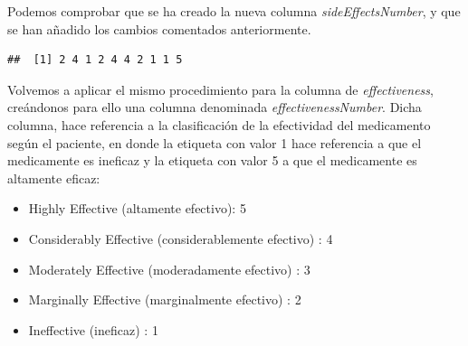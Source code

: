 \documentclass[spanish,]{article}
\newenvironment{Shaded}{\begin{snugshade}}{\end{snugshade}}
\newcommand{\KeywordTok}[1]{\textcolor[rgb]{0.13,0.29,0.53}{\textbf{#1}}}
\newcommand{\DecValTok}[1]{\textcolor[rgb]{0.00,0.00,0.81}{#1}}
\newcommand{\OperatorTok}[1]{\textcolor[rgb]{0.81,0.36,0.00}{\textbf{#1}}}
\newcommand{\NormalTok}[1]{#1}
\providecommand{\tightlist}{%
  \setlength{\itemsep}{0pt}\setlength{\parskip}{0pt}}
\begin{document}
Podemos comprobar que se ha creado la nueva columna
\emph{sideEffectsNumber}, y que se han añadido los cambios comentados
anteriormente.

\begin{Shaded}
\end{Shaded}

\begin{verbatim}
##  [1] 2 4 1 2 4 4 2 1 1 5
\end{verbatim}

Volvemos a aplicar el mismo procedimiento para la columna de
\emph{effectiveness}, creándonos para ello una columna denominada
\emph{effectivenessNumber}. Dicha columna, hace referencia a la
clasificación de la efectividad del medicamento según el paciente, en
donde la etiqueta con valor 1 hace referencia a que el medicamente es
ineficaz y la etiqueta con valor 5 a que el medicamente es altamente
eficaz:

\begin{itemize}
\tightlist
\item
  Highly Effective (altamente efectivo): 5
\item
  Considerably Effective (considerablemente efectivo) : 4
\item
  Moderately Effective (moderadamente efectivo) : 3
\item
  Marginally Effective (marginalmente efectivo) : 2
\item
  Ineffective (ineficaz) : 1
\end{itemize}
\end{document}
